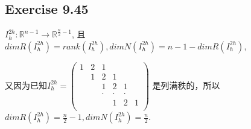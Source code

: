 \documentclass[UTF8]{ctexart}
\begin{document}
\subsection*{Exercise 9.45}
$I_h^{2h}:\mathbb{R} ^{n-1} \rightarrow \mathbb{R}^{\frac{n}{2}-1}$, 且$dimR(I_h^{2h})=rank(I_h^{2h}), dimN(I_h^{2h}) = n-1-dimR(I_h^{2h})$,

又因为已知$I_h^{2h }=$$\begin{pmatrix}
    1 & 2 & 1 & & & \\
      & 1 & 2 & 1 & \\
      & & 1 & 2 & 1 \\
       & &\cdot &\cdot &\cdot & \\
      & & & 1 & 2 & 1 \\
\end{pmatrix}$
是列满秩的，所以$dimR(I_h^{2h}) = \frac{n}{2} - 1, dimN(I_h^{2h}) = \frac{n}{2}$.







\end{document}

